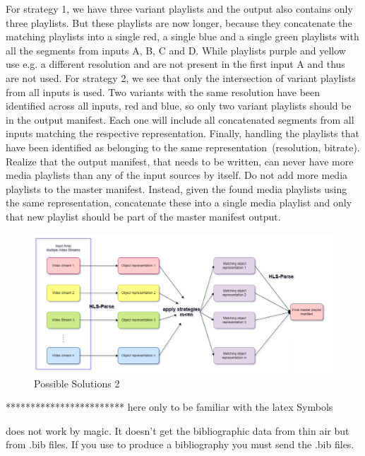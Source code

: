  
 For strategy 1, we have three variant playlists and the output also contains only three playlists. But these playlists are now longer, because they concatenate the matching playlists into a single red, a single blue and a single green playlists with all the segments from inputs A, B, C and D. While playlists purple and yellow use e.g. a different resolution and are not present in the first input A and thus are not used. 
For strategy 2, we see that only the intersection of variant playlists from all inputs is used. Two variants with the same resolution have been identified across all inputs, red and blue, so only two variant playlists should be in the output manifest. Each one will include all concatenated segments from all inputs matching the respective representation.
Finally, handling the playlists that have been identified as belonging to the same representation (resolution, bitrate). Realize that the output manifest, that needs to be written, can never have more media playlists than any of the input sources by itself. Do not add more media playlists to the master manifest. Instead, given the found media playlists using the same representation, concatenate these into a single media playlist and only that new playlist should be part of the master manifest output.




\begin{figure}

\centering
\includegraphics[scale=0.32]{figures/PossibleSolutions2.png}
\caption{Possible Solutions 2 }
\label{fig:IMT_2020_Use-cases}
\end{figure}





************************
here only to be familiar with the latex Symbols 

{\BibTeX} does not work by magic. It doesn't get the bibliographic
data from thin air but from .bib files. If you use {\BibTeX} to produce a
bibliography you must send the .bib files. 

